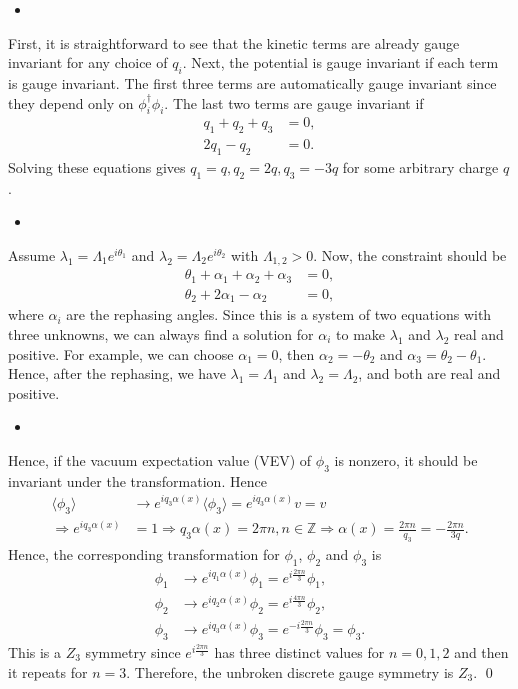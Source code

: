 \answer{}
\begin{itemize}
    \item [(a)]
\end{itemize}
First, it is straightforward to see that the kinetic terms are already gauge invariant for any choice of $q_i$. Next, the potential is gauge invariant if each term is gauge invariant. The first three terms are automatically gauge invariant since they depend only on $\phi_i^\dagger \phi_i$. The last two terms are gauge invariant if
\begin{align}
    q_1+q_2+q_3&=0,\\
    2q_1-q_2&=0.
\end{align}
Solving these equations gives $q_1=q, q_2=2q, q_3=-3q$ for some arbitrary charge $q$.
\begin{itemize}
    \item [(b)]
\end{itemize}
Assume $\lambda_1 = \Lambda_1 e^{i\theta_1}$ and $\lambda_2 = \Lambda_2 e^{i\theta_2}$ with $\Lambda_{1,2}>0$. Now, the constraint should be 
\begin{align}
    \theta_1 + \alpha_1 + \alpha_2 + \alpha_3 &=0,\\
    \theta_2 + 2\alpha_1 - \alpha_2 &=0,
\end{align}
where $\alpha_i$ are the rephasing angles. Since this is a system of two equations with three unknowns, we can always find a solution for $\alpha_i$ to make $\lambda_1$ and $\lambda_2$ real and positive. For example, we can choose $\alpha_1=0$, then $\alpha_2=-\theta_2$ and $\alpha_3=\theta_2-\theta_1$. Hence, after the rephasing, we have $\lambda_1 = \Lambda_1$ and $\lambda_2 = \Lambda_2$, and both are real and positive.
\begin{itemize}
    \item [(c)] 
\end{itemize}
Hence, if the vacuum expectation value (VEV) of $\phi_3$ is nonzero, it should be invariant under the transformation. Hence 
\begin{align}
    \langle \phi_3\rangle &\to e^{iq_3\alpha(x)} \langle \phi_3\rangle = e^{iq_3\alpha(x)} v =v \\
    \Rightarrow e^{iq_3\alpha(x)}&=1 \Rightarrow q_3\alpha(x) =2\pi n, n\in \mathbb{Z} \Rightarrow \alpha(x) =\frac{2\pi n}{q_3} = -\frac{2\pi n}{3q}.
\end{align}
Hence, the corresponding transformation for $\phi_1$, $\phi_2$ and $\phi_3$ is
\begin{align}
    \phi_1 &\to e^{iq_1\alpha(x)} \phi_1 = e^{i\frac{2\pi n}{3}} \phi_1,\\
    \phi_2 &\to e^{iq_2\alpha(x)} \phi_2 = e^{i\frac{4\pi n}{3}} \phi_2,\\
    \phi_3 &\to e^{iq_3\alpha(x)} \phi_3 = e^{-i\frac{2\pi n}{3}} \phi_3 = \phi_3.
\end{align}
This is a $Z_3$ symmetry since $e^{i\frac{2\pi n}{3}}$ has three distinct values for $n=0,1,2$ and then it repeats for $n=3$. Therefore, the unbroken discrete gauge symmetry is $Z_3$.
\qed


